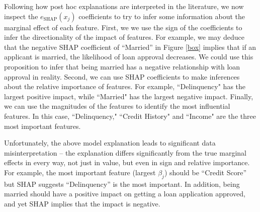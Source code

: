 \documentclass[mnsc,blindrev]{informs3}
\newcommand{\mM}{\mathcal{M}}
\begin{document}
 Following how post hoc explanations are interpreted in the literature, we now inspect the $e_\text{SHAP}(x_j)$ coefficients to try to infer some information about the marginal effect of each feature. First, we  we
 use the sign of the coefficients to infer the directionality of the impact of features. For example, we may deduce that the negative SHAP coefficient of ``Married'' in Figure \ref{box} implies that if an applicant is married, the likelihood of loan approval decreases. We could use this proposition to infer that being married has a negative relationship with loan approval in reality. Second, we can use SHAP coefficients to make inferences about the relative importance of features. For example, ``Delinquency" has the largest positive impact, while ``Married" has the largest negative impact. Finally, we can use the magnitudes of the features to identify the most influential features. In this case, ``Delinquency," ``Credit History" and ``Income" are the three most important features. 


Unfortunately, the above model explanation leads to significant data misinterpretation -- the  explanation differs significantly from the true marginal effects in every way, not just in value, but even in sign and relative importance. For example, the most important feature (largest $\beta_j$) should be ``Credit Score'' but SHAP suggests ``Delinquency'' is the most important. In addition, being married should have a positive impact on getting a loan application approved, and yet SHAP implies that the impact is negative. %
\end{document}
